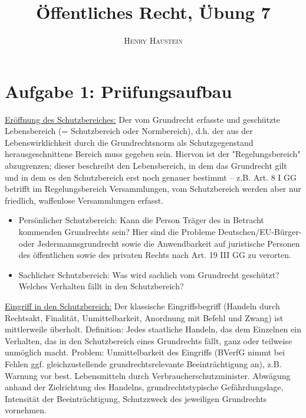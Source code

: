 \documentclass{article}
\title{\textbf{Öffentliches Recht, Übung 7}}
\author{\textsc{Henry Haustein}}
\date{}
\begin{document}
	\maketitle
	
	\section*{Aufgabe 1: Prüfungsaufbau}
	\underline{Eröffnung des Schutzbereiches:} Der vom Grundrecht erfasste und geschützte Lebensbereich (= Schutzbereich oder Normbereich), d.h. der aus der Lebenswirklichkeit durch die Grundrechtsnorm als Schutzgegenstand herausgeschnittene Bereich muss gegeben sein. Hiervon ist der "Regelungsbereich" abzugrenzen; dieser beschreibt den Lebensbereich, in dem das Grundrecht gilt und in dem es den Schutzbereich erst noch genauer bestimmt – z.B. Art. 8 I GG betrifft im Regelungsbereich Versammlungen, vom Schutzbereich werden aber nur friedlich, waffenlose Versammlungen erfasst. 
	\begin{itemize}
		\item Persönlicher Schutzbereich: Kann die Person Träger des in Betracht kommenden Grundrechts sein? Hier sind die Probleme Deutschen/EU-Bürger- oder Jedermannsgrundrecht sowie die Anwendbarkeit auf juristische Personen des öffentlichen sowie des privaten Rechts nach Art. 19 III GG zu verorten. 
		\item Sachlicher Schutzbereich: Was wird sachlich vom Grundrecht geschützt? Welches Verhalten fällt in den Schutzbereich? 
	\end{itemize}

	\underline{Eingriff in den Schutzbereich:} Der klassische Eingriffsbegriff (Handeln durch Rechtsakt, Finalität, Unmittelbarkeit, Anordnung mit Befehl und Zwang) ist mittlerweile überholt. Definition: Jedes staatliche Handeln, das dem Einzelnen ein Verhalten, das in den Schutzbereich eines Grundrechts fällt, ganz oder teilweise unmöglich macht. Problem: Unmittelbarkeit des Eingriffs (BVerfG nimmt bei Fehlen ggf. gleichzustellende grundrechtsrelevante Beeinträchtigung an), z.B. Warnung vor best. Lebensmitteln durch Verbraucherschutzminister. Abwägung anhand der Zielrichtung des Handelns, grundrechtstypische Gefährdungslage, Intensität der Beeinträchtigung, Schutzzweck des jeweiligen Grundrechts vornehmen. 
	
\end{document}
